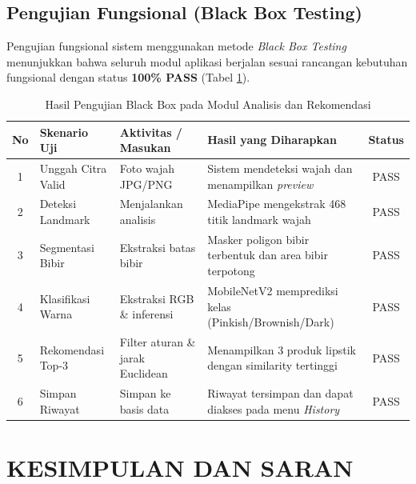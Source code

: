 \documentclass[10pt,a4paper]{article}
\begin{document}
\subsection{Pengujian Fungsional (Black Box Testing)}
Pengujian fungsional sistem menggunakan metode \textit{Black Box Testing} menunjukkan bahwa seluruh modul aplikasi berjalan sesuai rancangan kebutuhan fungsional dengan status \textbf{100\% PASS} (Tabel \ref{tab:blackbox}).

\begin{table}[htbp]
  \centering
  \caption{Hasil Pengujian Black Box pada Modul Analisis dan Rekomendasi}
  \label{tab:blackbox}
  \fontsize{8pt}{10pt}\selectfont
  \begin{tabularx}{\textwidth}{clXXc}
    \toprule
    \textbf{No} & \textbf{Skenario Uji} & \textbf{Aktivitas / Masukan} & \textbf{Hasil yang Diharapkan} & \textbf{Status} \\
    \midrule
    1 & Unggah Citra Valid & Foto wajah JPG/PNG & Sistem mendeteksi wajah dan menampilkan \textit{preview} & PASS \\
    2 & Deteksi Landmark   & Menjalankan analisis & MediaPipe mengekstrak 468 titik landmark wajah & PASS \\
    3 & Segmentasi Bibir   & Ekstraksi batas bibir & Masker poligon bibir terbentuk dan area bibir terpotong & PASS \\
    4 & Klasifikasi Warna  & Ekstraksi RGB \& inferensi & MobileNetV2 memprediksi kelas (Pinkish/Brownish/Dark) & PASS \\
    5 & Rekomendasi Top-3  & Filter aturan \& jarak Euclidean & Menampilkan 3 produk lipstik dengan similarity tertinggi & PASS \\
    6 & Simpan Riwayat     & Simpan ke basis data & Riwayat tersimpan dan dapat diakses pada menu \textit{History} & PASS \\
    \bottomrule
  \end{tabularx}
\end{table}

\FloatBarrier
\section{KESIMPULAN DAN SARAN}
\end{document}
